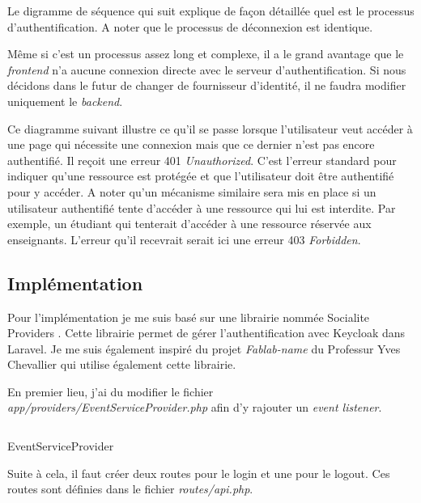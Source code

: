 Le digramme de séquence qui suit explique de façon détaillée quel est le processus d'authentification. A noter que le processus de déconnexion est identique.

Même si c'est un processus assez long et complexe, il a le grand avantage que le \emph{frontend} n'a aucune connexion directe avec le serveur d'authentification. Si nous décidons dans le futur de changer de fournisseur d'identité, il ne faudra modifier uniquement le \emph{backend}.


Ce diagramme suivant illustre ce qu'il se passe lorsque l'utilisateur veut accéder à une page qui nécessite une connexion mais que ce dernier n'est pas encore authentifié. Il reçoit une erreur 401 \emph{Unauthorized}. C'est l'erreur standard pour indiquer qu'une ressource est protégée et que l'utilisateur doit être authentifié pour y accéder. A noter qu'un mécanisme similaire sera mis en place si un utilisateur authentifié tente d'accéder à une ressource qui lui est interdite. Par exemple, un étudiant qui tenterait d'accéder à une ressource réservée aux enseignants. L'erreur qu'il recevrait serait ici une erreur 403 \emph{Forbidden}.

\subsection{Implémentation}
Pour l'implémentation je me suis basé sur une librairie nommée Socialite Providers \cite{SocialiteProviders}. Cette librairie permet de gérer l'authentification avec Keycloak dans Laravel. Je me suis également inspiré du projet \emph{Fablab-name} \cite{FablabName} du Professur Yves Chevallier qui utilise également cette librairie.

En premier lieu, j'ai du modifier le fichier \emph{app/providers/EventServiceProvider.php} afin d'y rajouter un \emph{event listener}.
\begin{listing}[H]
    \inputminted{php}{assets/code/serviceProviderkeycloak.php}
    \caption{EventServiceProvider \label{serviceProviderkeycloak}}
\end{listing}

Suite à cela, il faut créer deux routes pour le login et une pour le logout. Ces routes sont définies dans le fichier \emph{routes/api.php}.

